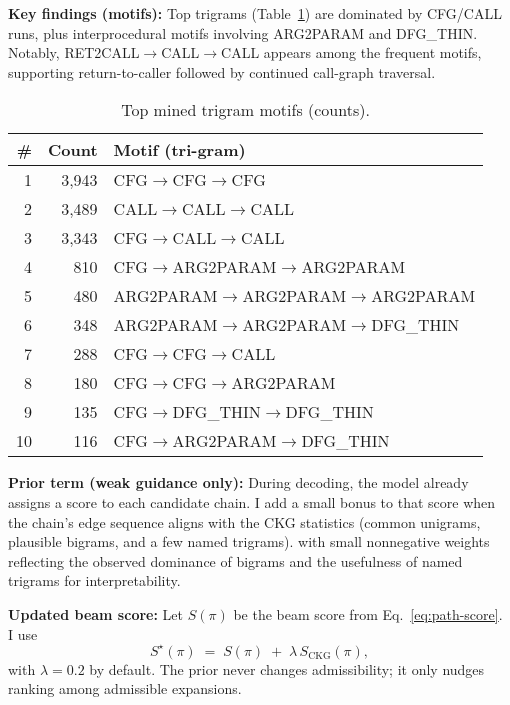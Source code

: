 \documentclass{buthesis}
\begin{document}
\textbf{Key findings (motifs):}
Top trigrams (Table~\ref{tab:ckg-motifs}) are dominated by \textsc{CFG}/\textsc{CALL} runs, plus interprocedural motifs involving \textsc{ARG2PARAM} and \textsc{DFG\_THIN}. Notably, \textsc{RET2CALL}$\!\to$\textsc{CALL}$\!\to$\textsc{CALL} appears among the frequent motifs, supporting return-to-caller followed by continued call-graph traversal.

\begin{table}[H]
\centering
\caption{Top mined trigram motifs (counts).}
\label{tab:ckg-motifs}
\begin{tabular}{r r l}
\toprule
\# & \textbf{Count} & \textbf{Motif (tri-gram)} \\
\midrule
1  & 3{,}943 & \textsc{CFG}$\!\to$\textsc{CFG}$\!\to$\textsc{CFG} \\
2  & 3{,}489 & \textsc{CALL}$\!\to$\textsc{CALL}$\!\to$\textsc{CALL} \\
3  & 3{,}343 & \textsc{CFG}$\!\to$\textsc{CALL}$\!\to$\textsc{CALL} \\
4  & 810     & \textsc{CFG}$\!\to$\textsc{ARG2PARAM}$\!\to$\textsc{ARG2PARAM} \\
5  & 480     & \textsc{ARG2PARAM}$\!\to$\textsc{ARG2PARAM}$\!\to$\textsc{ARG2PARAM} \\
6  & 348     & \textsc{ARG2PARAM}$\!\to$\textsc{ARG2PARAM}$\!\to$\textsc{DFG\_THIN} \\
7  & 288     & \textsc{CFG}$\!\to$\textsc{CFG}$\!\to$\textsc{CALL} \\
8  & 180     & \textsc{CFG}$\!\to$\textsc{CFG}$\!\to$\textsc{ARG2PARAM} \\
9  & 135     & \textsc{CFG}$\!\to$\textsc{DFG\_THIN}$\!\to$\textsc{DFG\_THIN} \\
10 & 116     & \textsc{CFG}$\!\to$\textsc{ARG2PARAM}$\!\to$\textsc{DFG\_THIN} \\
\bottomrule
\end{tabular}
\end{table}

\textbf{Prior term (weak guidance only):}
During decoding, the model already assigns a score to each candidate chain. I add a small bonus to that score when the chain’s edge sequence aligns with the CKG statistics (common unigrams, plausible bigrams, and a few named trigrams). with small nonnegative weights reflecting the observed dominance of bigrams and the usefulness of named trigrams for interpretability.

\textbf{Updated beam score:}
Let $S(\pi)$ be the beam score from Eq.~\eqref{eq:path-score}. I use
\begin{equation}
\label{eq:path-score-ckg}
S^{\star}(\pi) \;=\; S(\pi) \;+\; \lambda\, S_{\mathrm{CKG}}(\pi),
\end{equation}
with $\lambda{=}0.2$ by default. The prior never changes admissibility; it only nudges ranking among admissible expansions.
\end{document}

